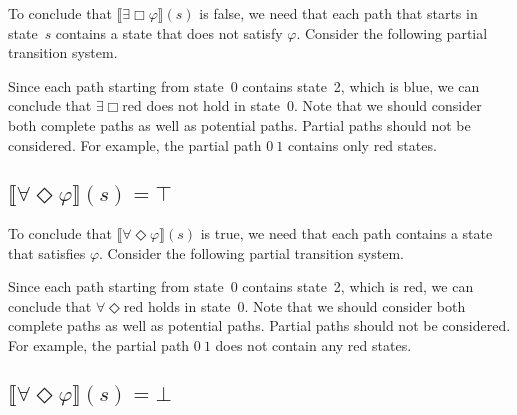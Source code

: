 \documentclass[12pt]{article}
\newcommand{\always}{\Box}
\newcommand{\eventually}{\Diamond}
\theoremstyle{definition}
\newcommand{\satisfaction}[1]{\llbracket #1 \rrbracket}
\newcommand{\bottom}{\mathord{\perp}}
\begin{document}
To conclude that $\satisfaction{\exists \always \varphi}(s)$ is false, we need that each path that starts in state~$s$ contains a state that does not satisfy $\varphi$.  Consider the following partial transition system.
\begin{center}
\end{center}
Since each path starting from state~0 contains state~2, which is blue, we can conclude that $\exists \always \mbox{red}$ does not hold in state~0.  Note that we should consider both complete paths as well as potential paths.  Partial paths should not be considered.  For example, the partial path $0\ 1$ contains only red states.

\subsection*{$\satisfaction{\forall \eventually \varphi}(s) = \top$}

To conclude that $\satisfaction{\forall \eventually \varphi}(s)$ is true, we need that each path contains a state that satisfies $\varphi$.  Consider the following partial transition system.
\begin{center}
\end{center}
Since each path starting from state~0 contains state~2, which is red, we can conclude that $\forall \eventually \mbox{red}$ holds in state~0.  Note that we should consider both complete paths as well as potential paths.  Partial paths should not be considered.  For example, the partial path $0\ 1$ does not contain any red states.

\subsection*{$\satisfaction{\forall \eventually \varphi}(s) = \bottom$}
\end{document}
